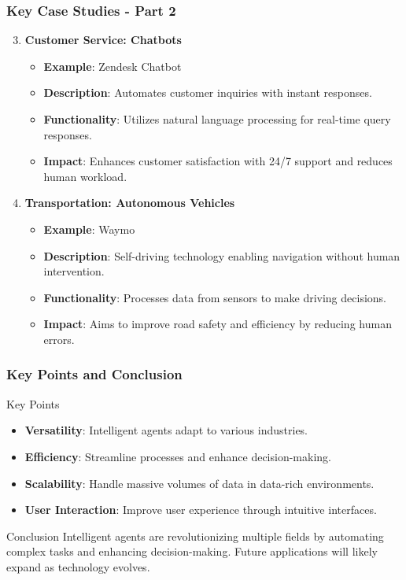 \documentclass[aspectratio=169]{beamer}
\begin{document}
\begin{frame}[fragile]
    \frametitle{Key Case Studies - Part 2}
    \begin{enumerate}
        \setcounter{enumi}{2}  %
        \item \textbf{Customer Service: Chatbots}
            \begin{itemize}
                \item \textbf{Example}: Zendesk Chatbot
                \item \textbf{Description}: Automates customer inquiries with instant responses.
                \item \textbf{Functionality}: Utilizes natural language processing for real-time query responses.
                \item \textbf{Impact}: Enhances customer satisfaction with 24/7 support and reduces human workload.
            \end{itemize}
    
        \item \textbf{Transportation: Autonomous Vehicles}
            \begin{itemize}
                \item \textbf{Example}: Waymo
                \item \textbf{Description}: Self-driving technology enabling navigation without human intervention.
                \item \textbf{Functionality}: Processes data from sensors to make driving decisions.
                \item \textbf{Impact}: Aims to improve road safety and efficiency by reducing human errors.
            \end{itemize}
    \end{enumerate}
\end{frame}

\begin{frame}[fragile]
    \frametitle{Key Points and Conclusion}
    \begin{block}{Key Points}
        \begin{itemize}
            \item \textbf{Versatility}: Intelligent agents adapt to various industries.
            \item \textbf{Efficiency}: Streamline processes and enhance decision-making.
            \item \textbf{Scalability}: Handle massive volumes of data in data-rich environments.
            \item \textbf{User Interaction}: Improve user experience through intuitive interfaces.
        \end{itemize}
    \end{block}

    \begin{block}{Conclusion}
        Intelligent agents are revolutionizing multiple fields by automating complex tasks and enhancing decision-making. Future applications will likely expand as technology evolves.
    \end{block}
\end{frame}
\end{document}
